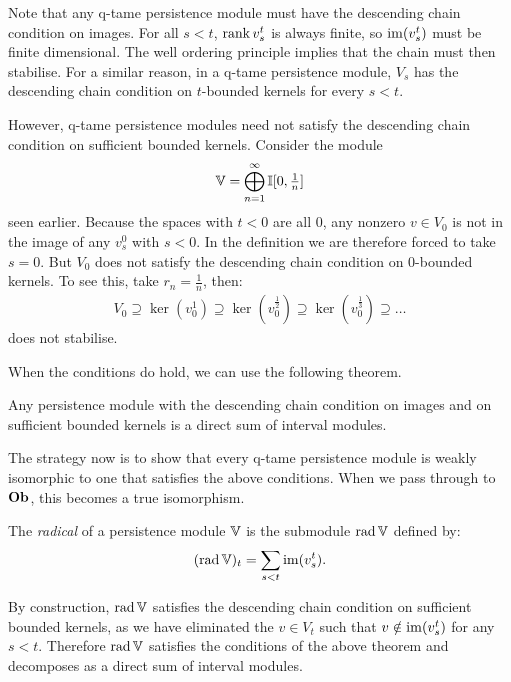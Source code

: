Note that any q-tame persistence module must have the descending chain condition on images. For all $s < t$, $\operatorname{rank} v_s^t$ is always finite, so $\operatorname{im}(v_s^t)$ must be finite dimensional. The well ordering principle implies that the chain must then stabilise. For a similar reason, in a q-tame persistence module, $V_s$ has the descending chain condition on $t$-bounded kernels for every $s < t$.

However, q-tame persistence modules need not satisfy the descending chain condition on sufficient bounded kernels. Consider the module 
\begin{align*}
\mathbb{V} = \bigoplus_{n=1}^\infty \mathbb{I}[0, \tfrac{1}{n}]
\end{align*}
seen earlier. Because the spaces with $t < 0$ are all $0$, any nonzero $v \in V_0$ is not in the image of any $v_s^0$ with $s < 0$. In the definition we are therefore forced to take $s = 0$. But $V_0$ does not satisfy the descending chain condition on $0$-bounded kernels. To see this, take $r_n = \tfrac{1}{n}$, then:
\begin{align*}
V_0 \supseteq \ker(v_0^1) \supseteq \ker(v_0^{\frac{1}{2}}) \supseteq \ker(v_0^{\frac{1}{3}}) \supseteq \dots
\end{align*}
does not stabilise.

When the conditions do hold, we can use the following theorem.

\begin{theorem}
Any persistence module with the descending chain condition on images and on sufficient bounded kernels is a direct sum of interval modules.
\end{theorem}

The strategy now is to show that every q-tame persistence module is weakly isomorphic to one that satisfies the above conditions. When we pass through to $\mathbf{Ob}$, this becomes a true isomorphism.

\begin{definition}
The \emph{radical} of a persistence module $\mathbb{V}$ is the submodule $\operatorname{rad} \mathbb{V}$ defined by:
\begin{align*}
(\operatorname{rad} \mathbb{V})_t = \sum_{s < t} \operatorname{im}(v_s^t).
\end{align*}
\end{definition}

By construction, $\operatorname{rad} \mathbb{V}$ satisfies the descending chain condition on sufficient bounded kernels, as we have eliminated the $v \in V_t$ such that $v \notin \operatorname{im}(v_s^t)$ for any $s < t$. Therefore $\operatorname{rad} \mathbb{V}$ satisfies the conditions of the above theorem and decomposes as a direct sum of interval modules.

